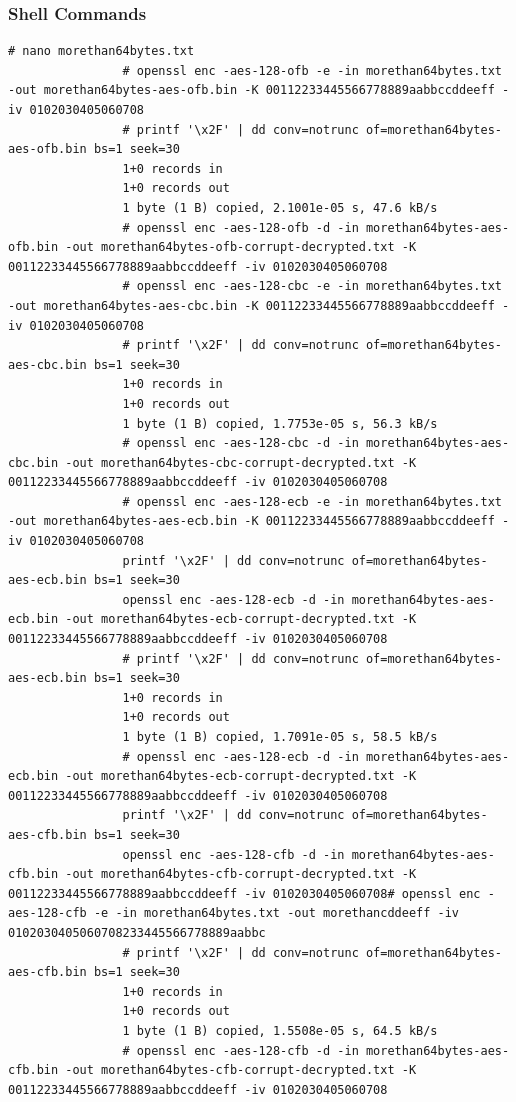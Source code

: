 		\subsubsection{Shell Commands}
			\begin{lstlisting}[label={Shell Commands},caption={Task 1}]
				# nano morethan64bytes.txt
				# openssl enc -aes-128-ofb -e -in morethan64bytes.txt -out morethan64bytes-aes-ofb.bin -K 00112233445566778889aabbccddeeff -iv 0102030405060708
				# printf '\x2F' | dd conv=notrunc of=morethan64bytes-aes-ofb.bin bs=1 seek=30
				1+0 records in
				1+0 records out
				1 byte (1 B) copied, 2.1001e-05 s, 47.6 kB/s
				# openssl enc -aes-128-ofb -d -in morethan64bytes-aes-ofb.bin -out morethan64bytes-ofb-corrupt-decrypted.txt -K 00112233445566778889aabbccddeeff -iv 0102030405060708
				# openssl enc -aes-128-cbc -e -in morethan64bytes.txt -out morethan64bytes-aes-cbc.bin -K 00112233445566778889aabbccddeeff -iv 0102030405060708
				# printf '\x2F' | dd conv=notrunc of=morethan64bytes-aes-cbc.bin bs=1 seek=30
				1+0 records in
				1+0 records out
				1 byte (1 B) copied, 1.7753e-05 s, 56.3 kB/s
				# openssl enc -aes-128-cbc -d -in morethan64bytes-aes-cbc.bin -out morethan64bytes-cbc-corrupt-decrypted.txt -K 00112233445566778889aabbccddeeff -iv 0102030405060708
				# openssl enc -aes-128-ecb -e -in morethan64bytes.txt -out morethan64bytes-aes-ecb.bin -K 00112233445566778889aabbccddeeff -iv 0102030405060708
				printf '\x2F' | dd conv=notrunc of=morethan64bytes-aes-ecb.bin bs=1 seek=30
				openssl enc -aes-128-ecb -d -in morethan64bytes-aes-ecb.bin -out morethan64bytes-ecb-corrupt-decrypted.txt -K 00112233445566778889aabbccddeeff -iv 0102030405060708
				# printf '\x2F' | dd conv=notrunc of=morethan64bytes-aes-ecb.bin bs=1 seek=30
				1+0 records in
				1+0 records out
				1 byte (1 B) copied, 1.7091e-05 s, 58.5 kB/s
				# openssl enc -aes-128-ecb -d -in morethan64bytes-aes-ecb.bin -out morethan64bytes-ecb-corrupt-decrypted.txt -K 00112233445566778889aabbccddeeff -iv 0102030405060708
				printf '\x2F' | dd conv=notrunc of=morethan64bytes-aes-cfb.bin bs=1 seek=30
				openssl enc -aes-128-cfb -d -in morethan64bytes-aes-cfb.bin -out morethan64bytes-cfb-corrupt-decrypted.txt -K 00112233445566778889aabbccddeeff -iv 0102030405060708# openssl enc -aes-128-cfb -e -in morethan64bytes.txt -out morethancddeeff -iv 0102030405060708233445566778889aabbc
				# printf '\x2F' | dd conv=notrunc of=morethan64bytes-aes-cfb.bin bs=1 seek=30
				1+0 records in
				1+0 records out
				1 byte (1 B) copied, 1.5508e-05 s, 64.5 kB/s
				# openssl enc -aes-128-cfb -d -in morethan64bytes-aes-cfb.bin -out morethan64bytes-cfb-corrupt-decrypted.txt -K 00112233445566778889aabbccddeeff -iv 0102030405060708

\end{lstlisting}
